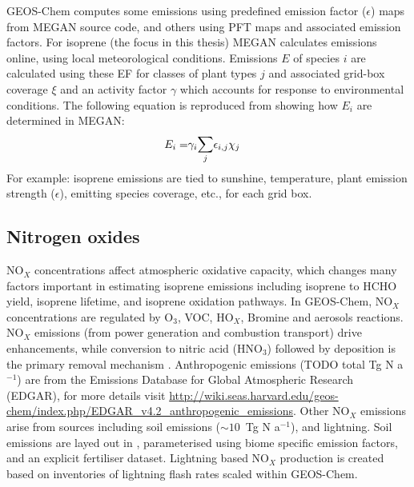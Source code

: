     GEOS-Chem computes some emissions using predefined emission factor ($\epsilon$) maps from MEGAN source code, and others using PFT maps and associated emission factors.
    For isoprene (the focus in this thesis) MEGAN calculates emissions online, using local meteorological conditions.
    Emissions $E$ of species $i$ are calculated using these EF for classes of plant types $j$ and associated grid-box coverage $\xi$ and an activity factor $\gamma$ which accounts for response to environmental conditions.
    The following equation is reproduced from \textcite{Guenther2012} showing how $E_i$ are determined in MEGAN: 
    \begin{eqnarray} 
      \label{Model:GC:MEGAN:eqn_emission_factors}
      E_i = & \gamma_i \mathlarger{\sum}_j{\epsilon_{i,j} \chi_j}
    \end{eqnarray}
    For example: isoprene emissions are tied to sunshine, temperature, plant emission strength ($\epsilon$), emitting species coverage, etc., for each grid box.
    
  \subsection{Nitrogen oxides}
  \label{Model:GC:NOx}
    NO$_X$ concentrations affect atmospheric oxidative capacity, which changes many factors important in estimating isoprene emissions including isoprene to HCHO yield, isoprene lifetime, and isoprene oxidation pathways.
    In GEOS-Chem, NO$_X$ concentrations are regulated by O$_3$, VOC, HO$_X$, Bromine and aerosols reactions.
    NO$_X$ emissions (from power generation and combustion transport) drive enhancements, while conversion to nitric acid (HNO$_3$) followed by deposition is the primary removal mechanism \parencite{Delmas1997, Ayers2006}.
    Anthropogenic emissions (TODO total Tg N a$^{-1}$) are from the Emissions Database for Global Atmospheric Research (EDGAR), for more details visit \url{http://wiki.seas.harvard.edu/geos-chem/index.php/EDGAR_v4.2_anthropogenic_emissions}.
    Other NO$_X$ emissions arise from sources including soil emissions ($\sim 10$~Tg N a$^{-1}$), and lightning.
    Soil emissions are layed out in \textcite{Hudson2012}, parameterised using biome specific emission factors, and an explicit fertiliser dataset.
    Lightning based NO$_X$ production is created based on inventories of lightning flash rates scaled within GEOS-Chem.
    
